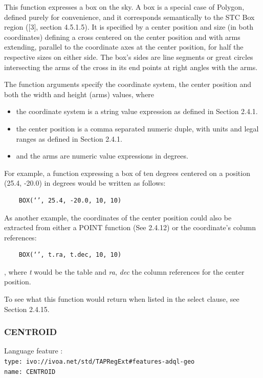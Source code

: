 \documentclass[11pt,a4paper]{ivoa}
\begin{document}
This function expresses a box on the sky. A box is a special case of Polygon,
defined purely for convenience, and it corresponds semantically to the STC Box
region ([3], section 4.5.1.5). It is specified by a center position and size
(in both coordinates) defining a cross centered on the center position and
with arms extending, parallel to the coordinate axes at the center position,
for half the respective sizes on either side. The box’s sides are line
segments or great circles intersecting the arms of the cross in its end
points at right angles with the arms.

The function arguments specify the coordinate system, the center position
and both the width and height (arms) values, where

\begin{itemize}
    \item the coordinate system is a string value expression as defined in Section 2.4.1.
    \item the center position is a comma separated numeric duple, with units and legal ranges as defined in Section 2.4.1.
    \item and the arms are numeric value expressions in degrees.
\end{itemize}

For example, a function expressing a box of ten degrees centered on a position
(25.4, -20.0) in degrees would be written as follows:

\begin{verbatim}
    BOX(‘’, 25.4, -20.0, 10, 10)
\end{verbatim}

As another example, the coordinates of the center position could also be
extracted from either a POINT function (See 2.4.12) or the coordinate’s
column references:

\begin{verbatim}
    BOX(‘’, t.ra, t.dec, 10, 10)
\end{verbatim}

, where \textit{t} would be the table and \textit{ra}, \textit{dec} the
column references for the center position.

To see what this function would return when listed in the select clause,
see Section 2.4.15.

\subsubsection{CENTROID}
\label{sec:geom.functions.centroid}
{\footnotesize Language feature :}\\
{\footnotesize \verb|type: ivo://ivoa.net/std/TAPRegExt#features-adql-geo|}\\
{\footnotesize \verb|name: CENTROID|}\\
\end{document}
